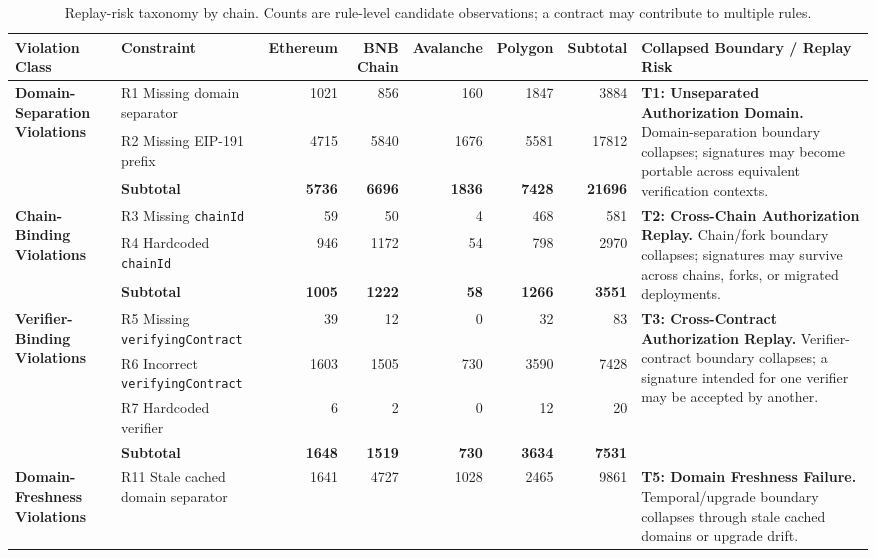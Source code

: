 \begin{table}[t]
\centering
\scriptsize
\caption{Replay-risk taxonomy by chain. Counts are rule-level candidate observations; a contract may contribute to multiple rules.}
\label{tab:taxonomy-by-chain}
\renewcommand{\arraystretch}{1.12}
\setlength{\tabcolsep}{2.6pt}
\begin{tabular}{p{2.35cm}p{2.8cm}rrrrrp{4.25cm}}
\toprule
\textbf{Violation Class} & \textbf{Constraint} & \textbf{Ethereum} & \textbf{BNB Chain} & \textbf{Avalanche} & \textbf{Polygon} & \textbf{Subtotal} & \textbf{Collapsed Boundary / Replay Risk} \\
\midrule
\multirow{3}{*}{\textbf{Domain-Separation Violations}} & R1 Missing domain separator & 1021 & 856 & 160 & 1847 & 3884 & \multirow{3}{4.25cm}{\textbf{T1: Unseparated Authorization Domain.} Domain-separation boundary collapses; signatures may become portable across equivalent verification contexts.} \\
 & R2 Missing EIP-191 prefix & 4715 & 5840 & 1676 & 5581 & 17812 &  \\
 & \textbf{Subtotal} & \textbf{5736} & \textbf{6696} & \textbf{1836} & \textbf{7428} & \textbf{21696} & \\
\midrule
\multirow{3}{*}{\textbf{Chain-Binding Violations}} & R3 Missing \texttt{chainId} & 59 & 50 & 4 & 468 & 581 & \multirow{3}{4.25cm}{\textbf{T2: Cross-Chain Authorization Replay.} Chain/fork boundary collapses; signatures may survive across chains, forks, or migrated deployments.} \\
 & R4 Hardcoded \texttt{chainId} & 946 & 1172 & 54 & 798 & 2970 &  \\
 & \textbf{Subtotal} & \textbf{1005} & \textbf{1222} & \textbf{58} & \textbf{1266} & \textbf{3551} & \\
\midrule
\multirow{4}{*}{\textbf{Verifier-Binding Violations}} & R5 Missing \texttt{verifyingContract} & 39 & 12 & 0 & 32 & 83 & \multirow{4}{4.25cm}{\textbf{T3: Cross-Contract Authorization Replay.} Verifier-contract boundary collapses; a signature intended for one verifier may be accepted by another.} \\
 & R6 Incorrect \texttt{verifyingContract} & 1603 & 1505 & 730 & 3590 & 7428 &  \\
 & R7 Hardcoded verifier & 6 & 2 & 0 & 12 & 20 &  \\
 & \textbf{Subtotal} & \textbf{1648} & \textbf{1519} & \textbf{730} & \textbf{3634} & \textbf{7531} & \\
\midrule
\multirow{3}{*}{\textbf{Domain-Freshness Violations}} & R11 Stale cached domain separator & 1641 & 4727 & 1028 & 2465 & 9861 & \multirow{3}{4.25cm}{\textbf{T5: Domain Freshness Failure.} Temporal/upgrade boundary collapses through stale cached domains or upgrade drift.} \\

\end{tabular}
\end{table}
